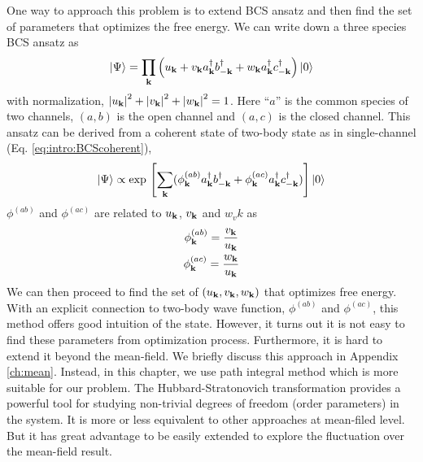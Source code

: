 One way to approach this problem is to extend BCS ansatz and then find the set of parameters that optimizes the free energy.  We can write down a  three species BCS ansatz as 
\begin{equation}\label{eq:pathInt2:ansatz}
\left|\Psi\right>=\prod_{\mathbf{k}}\left(u_{\mathbf{k}}+v_{\mathbf{k}}{}a^{\dagger}_{\mathbf{k}}{}b^{\dagger}_{-\mathbf{k}}+w_{\mathbf{k}}{}a^{\dagger}_{\mathbf{k}}{}c^{\dagger}_{-\mathbf{k}}\right)\left|0\right>
\end{equation} 
with normalization, $\left\lvert{u_{\ensuremath{\mathbf{k}}}}\right\rvert^2+\left\lvert{v_{\ensuremath{\mathbf{k}}}}\right\rvert^2+\left\lvert{w_{\ensuremath{\mathbf{k}}}}\right\rvert^2=1$.   Here ``$a$'' is the common species of two channels, $(a,b)$ is the open channel and $(a,c)$ is the closed channel.  This ansatz can be derived from a coherent state of two-body state as in single-channel (Eq. \ref{eq:intro:BCScoherent}), 
\begin{equation}\label{eq:pathInt2:ansatzCoh}
\left|\Psi\right>\propto\exp{}\left[\sum_{\mathbf{k}}(\phi^{(ab)}_{\mathbf{k}}{}a^{\dagger}_{\mathbf{k}}{}b^{\dagger}_{-\mathbf{k}}+\phi^{(ac)}_{\mathbf{k}}{}a^{\dagger}_{\mathbf{k}}{}c^{\dagger}_{-\mathbf{k}})\right]\left|0\right>
\end{equation} 
$\phi^{(ab)}$ and $\phi^{(ac)}$ are related to $u_{\mathbf{k}}$, $v_{\mathbf{k}}$ and $w_vk$ as  
\begin{gather}
\phi_{\mathbf{k}}^{(ab)}=\frac{v_{\mathbf{k}}}{u_{\mathbf{k}}}\\
\phi_{\mathbf{k}}^{(ac)}=\frac{w_{\mathbf{k}}}{u_{\mathbf{k}}}\label{eq:pathInt2:phiWU}
\end{gather}
 We can then proceed to find the set of $(u_{\mathbf{k}},v_{\mathbf{k}},w_{\mathbf{k}})$ that optimizes free energy.  With an explicit connection to two-body wave function, $\phi^{(ab)}$ and $\phi^{(ac)}$, this method offers good intuition of the state.  However, it turns out it is not easy to find these parameters from optimization process. Furthermore, it is hard to extend it beyond the mean-field.  We briefly discuss this approach in Appendix \ref{ch:mean}. Instead, in this chapter, we use path integral method which is more suitable for our problem.   The Hubbard-Stratonovich transformation provides a powerful tool for studying non-trivial degrees of freedom (order parameters) in the system.  It is more or less equivalent to other approaches at mean-filed level. But it has great advantage to be easily extended to explore the fluctuation over the mean-field result.  


